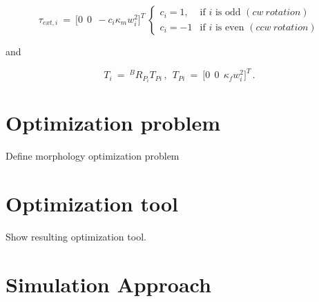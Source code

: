 \begin{equation}
  \label{tau_ext_i}
  \tau_{ext,i}  \ = \  \big[0 \ \  0 \ \  - c_i \kappa_m w_i^2 \big]^T \
  \begin{cases}
    c_i = 1, & \mbox{if } i \mbox{ is odd } (cw\ rotation)\\
    c_i = -1 & \mbox{if } i\mbox{ is even } (ccw\ rotation)
  \end{cases}
\end{equation}

and

\begin{equation}
  \label{T_i}
  T_i  \ = \ ^{B}R_{P_{i}} T_{Pi} \, ,\ \ T_{Pi}  \ = \ \big[0 \ \ 0 \ \
  \kappa_f w_i^2 \big]^T\, .
\end{equation}




\section{Optimization problem}
\label{sec:optimization_problem}
Define morphology optimization problem

\section{Optimization tool}
\label{sec:optimization_tool}
Show resulting optimization tool.

\section{Simulation Approach}
\label{sec:control_approach}
